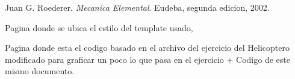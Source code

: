 \documentclass[fleqn,10pt]{SelfArx} %
\begin{document}

\begin{thebibliography}{9}
Juan G. Roederer. 
\textit{Mecanica Elemental}. 
Eudeba, segunda edicion, 2002.


Pagina donde se ubica el estilo del template usado,
\\\href{http://www.latextemplates.com/}{\color{B}{Latex Template}}

Pagina donde esta el codigo basado en el archivo del ejercicio del Helicoptero 
modificado para graficar un poco lo que pasa en el ejercicio + Codigo de este mismo documento.
\\\href{https://github.com/remusezequiel/Apuntes-Varios-Propios/tree/master/Tarea_1}{\color{B}{Repo Git}}
\end{thebibliography}



\end{document}
